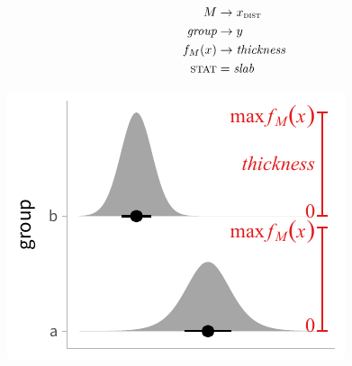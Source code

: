 \documentclass[journal]{vgtc}              %
\begin{document}
\noindent
\begin{minipage}{.5\columnwidth}

\begin{align*}
M &\rightarrow x_\textsc{dist}\\
\textit{group} &\rightarrow y\\
f_M(x) &\rightarrow \textit{thickness}\\
\textsc{stat} &= \mathit{slab}
\end{align*}
\end{minipage}%
  \begin{minipage}{.4\columnwidth}
    \centering
    \includegraphics[width=1.2\columnwidth]{figs/3-slab_density_two_groups.pdf}
  \end{minipage}
\hfill\break
\end{document}
